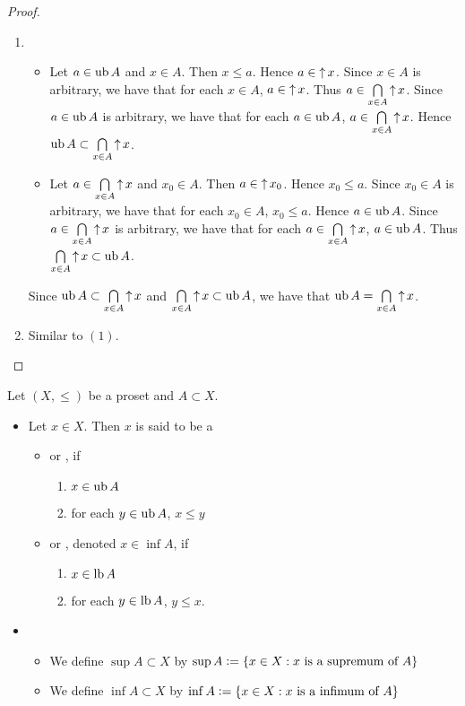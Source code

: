 \documentclass{book}
\begin{document}
	\begin{proof}\
		\begin{enumerate}
			\item 
			\begin{itemize}
				\item Let $a \in \operatorname{ub} A$ and $x \in A$. Then $x \leq a$. Hence $a \in \operatorname{\uparrow} x$. Since $x \in A$ is arbitrary, we have that for each $x \in A$, $a \in \operatorname{\uparrow} x$. Thus $a \in \bigcap\limits_{x \in A} \operatorname{\uparrow} x$. Since $a \in \operatorname{ub} A$ is arbitrary, we have that for each $a \in \operatorname{ub} A$, $a \in \bigcap\limits_{x \in A} \operatorname{\uparrow} x$. Hence $\operatorname{ub} A \subset \bigcap\limits_{x \in A} \operatorname{\uparrow} x$.  
				\item Let $a \in \bigcap\limits_{x \in A} \operatorname{\uparrow} x$ and $x_0 \in A$. Then $a \in \operatorname{\uparrow} x_0$. Hence $x_0 \leq a$. Since $x_0 \in A$ is arbitrary, we have that for each $x_0 \in A$, $x_0 \leq a$. Hence $a \in \operatorname{ub} A$. Since $a \in \bigcap\limits_{x \in A} \operatorname{\uparrow} x$ is arbitrary, we have that for each $a \in \bigcap\limits_{x \in A} \operatorname{\uparrow} x$, $a \in \operatorname{ub} A$. Thus $\bigcap\limits_{x \in A} \operatorname{\uparrow} x \subset \operatorname{ub} A$.
			\end{itemize}
			Since $\operatorname{ub} A \subset \bigcap\limits_{x \in A} \operatorname{\uparrow} x$ and $\bigcap\limits_{x \in A} \operatorname{\uparrow} x \subset \operatorname{ub} A$, we have that $\operatorname{ub} A = \bigcap\limits_{x \in A} \operatorname{\uparrow} x$.
			\item Similar to $(1)$.
		\end{enumerate}
	\end{proof}
	
	\begin{defn} 
		Let $(X, \leq)$ be a proset and $A \subset X$.
		\begin{itemize}
			\item Let $x \in X$. Then $x$ is said to be a 
			\begin{itemize}
				\item {} or , if 
				\begin{enumerate}
					\item $x \in \operatorname{ub} A$
					\item for each $y \in \operatorname{ub} A$, $x \leq y$ 
				\end{enumerate}
				\item {} or , denoted $x \in \inf A$, if 
				\begin{enumerate}
					\item $x \in \operatorname{lb} A$
					\item for each $y \in \operatorname{lb} A$, $y \leq x$. 
				\end{enumerate}
			\end{itemize}
			\item 
			\begin{itemize}
				\item We define $\sup A \subset X$ by $\sup A \vcentcolon= \{x \in X: \text{$x$ is a supremum of $A$}\}$
				\item We define $\inf A \subset X$ by $\inf A \vcentcolon= \{x \in X: \text{$x$ is a infimum of $A$}\}$
			\end{itemize}
		\end{itemize}
	\end{defn}
	
\end{document}
